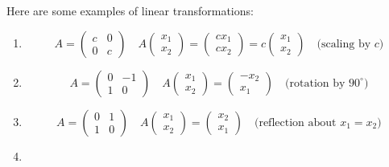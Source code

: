 \begin{eg}
    Here are some examples of linear transformations:
    \begin{enumerate}[label=$\arabic*^\circ$]
        \item 
        \[
            A = \begin{pmatrix}
                c & 0 \\
                0 & c
            \end{pmatrix} \quad A\begin{pmatrix}
                x_1 \\ x_2
            \end{pmatrix} = \begin{pmatrix}
                cx_1 \\ cx_2
            \end{pmatrix} = c \begin{pmatrix}
                x_1 \\ x_2
            \end{pmatrix} \quad \text{(scaling by $c$)}
        \]
        \item 
        \[
            A = \begin{pmatrix}
                0 & -1 \\
                1 & 0
            \end{pmatrix} \quad A\begin{pmatrix}
                x_1 \\ x_2
            \end{pmatrix} = \begin{pmatrix}
                -x_2 \\ x_1
            \end{pmatrix} \quad \text{(rotation by $90^\circ$)}
        \]
        \item 
        \[
            A = \begin{pmatrix}
                0 & 1 \\
                1 & 0
            \end{pmatrix} \quad A\begin{pmatrix}
                x_1 \\ x_2
            \end{pmatrix} = \begin{pmatrix}
                x_2 \\ x_1
            \end{pmatrix} \quad \text{(reflection about $x_1 = x_2$)}
        \]
        \item 

\end{enumerate}
\end{eg}
